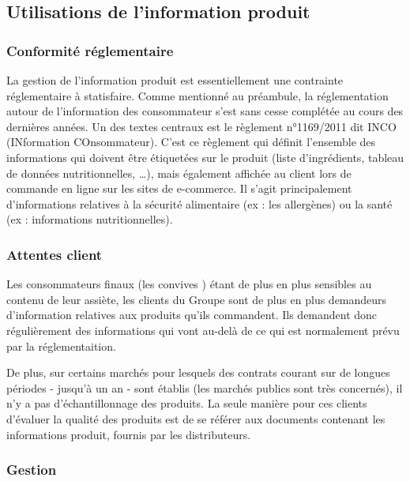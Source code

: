             \subsection{Utilisations de l'information produit}
            \label{utilisation_info_produit}

                \subsubsection{Conformité réglementaire}
                La gestion de l'information produit est essentiellement une contrainte réglementaire à statisfaire.
                Comme mentionné au préambule, la réglementation autour de l'information des consommateur s'est sans cesse complétée au cours des dernières années.
                Un des textes centraux est le règlement n°1169/2011 dit INCO (INformation COnsommateur)\cite{incotext}\cite{incoexpl}.
                C'est ce règlement qui définit l'ensemble des informations qui doivent être étiquetées sur le produit (liste d'ingrédients, tableau de données nutritionnelles, \dots), mais également affichée au client lors de commande en ligne sur les sites de e-commerce.
                Il s'agit principalement d'informations relatives à la sécurité alimentaire (ex : les allergènes) ou la santé (ex : informations nutritionnelles).

                \subsubsection{Attentes client}

                Les consommateurs finaux (les \og convives \fg) étant de plus en plus sensibles au contenu de leur assiète, les clients du Groupe sont de plus en plus demandeurs d'information relatives aux produits qu'ils commandent.
                Ils demandent donc régulièrement des informations qui vont au-delà de ce qui est normalement prévu par la réglementaition.

                De plus, sur certains marchés pour lesquels des contrats courant sur de longues périodes - jusqu'à un an - sont établis (les marchés publics sont très concernés), il n'y a pas d'échantillonnage des produits.
                La seule manière pour ces clients d'évaluer la qualité des produits est de se référer aux documents contenant les informations produit, fournis par les distributeurs.

                \subsubsection{Gestion}

